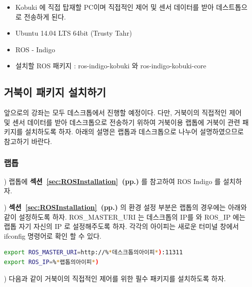 \begin{itemize}[leftmargin=*]
\item Kobuki 에 직접 탑재할 PC이며 직접적인 제어 및 센서 데이터를 받아 데스트톱으로 전송하게 된다.
\item Ubuntu 14.04 LTS 64bit (Trusty Tahr)
\item ROS - Indigo
\item 설치할 ROS 패키지 : ros-indigo-kobuki 와 ros-indigo-kobuki-core
 \end{itemize}

\subsection{거북이 패키지 설치하기}

앞으로의 강좌는 모두 데스크톱에서 진행할 예정이다. 다만, 거북이의 직접적인 제어 및 센서 데이터를 받아 데스크톱으로 전송하기 위하여 거북이용 랩톱에 거북이 관련 패키지를 설치하도록 하자. 아래의 설명은 랩톱과 데스크톱으로 나누어 설명하였으므로 참고하기 바란다.

\subsubsection{랩톱}

\setcounter{num}{0}

\vspace{\baselineskip}
\noindent{}
\thenum) 랩톱에 \textbf{섹션~\ref{sec:ROSInstallation}~(pp.\pageref{sec:ROSInstallation})} 를 참고하여 ROS Indigo 를 설치하자. 

\vspace{\baselineskip}
\noindent{}
\thenum) \textbf{섹션~\ref{sec:ROSInstallation}~(pp.\pageref{sec:ROSInstallation})} 의 환경 설정 부분은 랩톱의 경우에는 아래와 같이 설정하도록 하자. ROS\_MASTER\_URI 는 데스크톱의 IP를 와 ROS\_IP 에는 랩톱 자기 자신의  IP 로 설정해주도록 하자. 각각의 아이피는 새로운 터미널 창에서 ifconfig 명령어로 확인 할 수 있다.

\begin{lstlisting}[language=bash]
export ROS_MASTER_URI=http://%*데스크톱의아이피*):11311
export ROS_IP=%*랩톱의아이피*)
\end{lstlisting}

\vspace{\baselineskip}
\noindent{}
\thenum) 다음과 같이 거북이의 직접적인 제어를 위한 필수 패키지를 설치하도록 하자.

